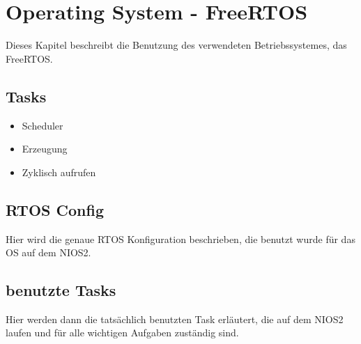  \chapter{Operating System - FreeRTOS}
 Dieses Kapitel beschreibt die Benutzung des verwendeten Betriebssystemes, das FreeRTOS. 
 \section{Tasks}
 \begin{itemize}
  \item Scheduler
  \item Erzeugung
  \item Zyklisch aufrufen
 \end{itemize}

 \section{RTOS Config}
 Hier wird die genaue RTOS Konfiguration beschrieben, die benutzt wurde für das OS auf dem NIOS2.
 \section{benutzte Tasks}
 Hier werden dann die tatsächlich benutzten Task erläutert, die auf dem NIOS2 laufen und für alle wichtigen Aufgaben zuständig sind.
